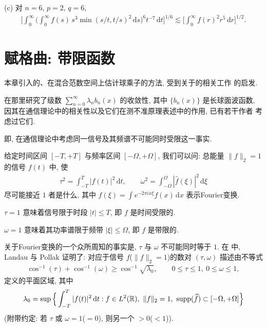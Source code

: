 (c) 对 $n = 6$, $p = 2$, $q = 6$,
\begin{align*}
  \Big[\int_{0}^{\infty}\Big(\int_{0}^{\infty}f(s)\,s^{3}\min(s/t,t/s)^{2}\,\mathrm{d}s\Big)^{6}t^{-7}\,\mathrm{d}t\Big]^{1/6}
  \lesssim\Big[\int_{0}^{\infty}f(r)^{2}r^{5}\,\mathrm{d}r\Big]^{1/2}.
\end{align*}

\section{赋格曲: 带限函数}

本章引入的、在混合范数空间上估计球乘子的方法, 受到关于的相关工作 \cite{b131,b130} 的启发.

在那里研究了级数 $\sum_{n=0}^{\infty} \lambda_n b_n(x)$ 的收敛性, 其中 $\{b_n(x)\}$ 是长球面波函数, 因其在通信理论中的相关性以及它们在测不准原理表述中的作用, 已有若干作者 \cite{b143,b137,b138,b142} 考虑过它们.

即, 在通信理论中考虑同一信号及其频谱不可能同时受限这一事实.

给定时间区间 $[-T, +T]$ 与频率区间 $[-\Omega, +\Omega]$, 我们可以问: 总能量 $\|f\|_2 = 1$ 的信号 $f(t)$ 中, 使
\begin{align*}
  \tau^{2}=\int_{-T}^{T}|f(t)|^{2}\,\mathrm{d}t,\qquad
  \omega^{2}=\int_{-\Omega}^{\Omega}|\widehat{f}(\xi)|^{2}\,\mathrm{d}\xi
\end{align*}
尽可能接近 $1$ 者是什么, 其中 $\widehat{f}(\xi) = \int e^{-2\pi i x\xi}f(x)\,\mathrm{d}x$ 表示Fourier变换.

$\tau = 1$ 意味着信号限于时段 $|t| \leq T$, 即 $f$ 是时间受限的.

$\omega = 1$ 意味着其功率谱限于频带 $|\xi| \leq \Omega$, 即 $f$ 是带限的.

关于Fourier变换的一个众所周知的事实是, $\tau$ 与 $\omega$ 不可能同时等于 $1$. 在 \cite{b137,b138} 中, Landau 与 Pollak 证明了: 对应于信号 $f$($\|f\|_2 = 1$)的数对 $(\tau, \omega)$ 描述由不等式
\begin{align*}
  \cos^{-1}(\tau)+\cos^{-1}(\omega)\geq\cos^{-1}\sqrt{\lambda_{0}},\qquad 0\leq\tau\leq 1,\ 0\leq\omega\leq 1,
\end{align*}
定义的平面区域, 其中
\begin{align*}
  \lambda_{0}=\sup\Big\{\int_{-T}^{T}|f(t)|^{2}\,\mathrm{d}t:
  f\in L^{2}(\R),\ \|f\|_{2}=1,\ \supp(\widehat{f})\subset[-\Omega,+\Omega]\Big\}
\end{align*}
(附带约定: 若 $\tau$ 或 $\omega = 1$($=0$), 则另一个 $> 0$($< 1$)).

